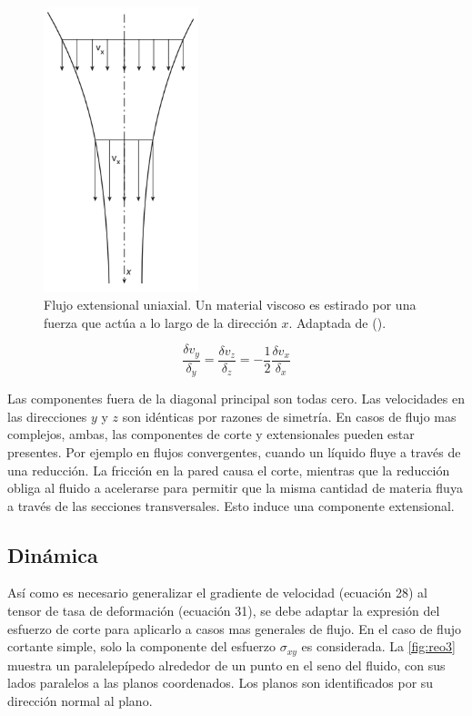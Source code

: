\begin{figure}\centering
    \includegraphics[width=0.4\textwidth]{Graphics/reo2.png}
    \caption[Flujo extensional uniaxial]{Flujo extensional uniaxial. Un material viscoso es estirado por una fuerza que actúa a lo largo de la dirección $x$. Adaptada de ().}
    \label{fig:reo2}
\end{figure}

\begin{equation}
\frac{\delta v_{y}}{\delta_{y}}=\frac{\delta v_{z}}{\delta_{z}}= -\frac{1}{2} \frac{\delta v_{x}}{\delta_{x}}
\end{equation}

Las componentes fuera de la diagonal principal son todas cero. Las velocidades en las direcciones $y$ y $z$ son idénticas por razones de simetría.
En casos de flujo mas complejos, ambas, las componentes de corte y extensionales pueden estar presentes. Por ejemplo en flujos convergentes, cuando un líquido fluye a través de una reducción. La fricción en la pared causa el corte, mientras que la reducción obliga al fluido a acelerarse para permitir que la misma cantidad de materia fluya a través de las secciones transversales. Esto induce una componente extensional.

\subsection{Dinámica}
Así como es necesario generalizar el gradiente de velocidad (ecuación 28) al tensor de tasa de deformación (ecuación 31), se debe adaptar la expresión del esfuerzo de corte para aplicarlo a casos mas generales de flujo. En el caso de flujo cortante simple, solo la componente del esfuerzo $\sigma_{xy}$ es considerada. La \autoref{fig:reo3} muestra un paralelepípedo alrededor de un punto en el seno del fluido, con sus lados paralelos a las planos coordenados. Los planos son identificados por su dirección normal al plano.

